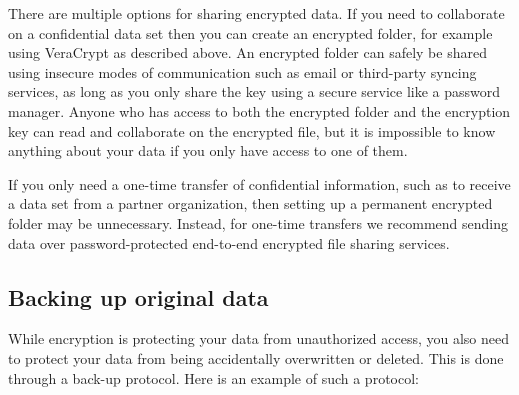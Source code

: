 There are multiple options for sharing encrypted data.
If you need to collaborate on a confidential data set
then you can create an encrypted folder,
for example using VeraCrypt as described above.
An encrypted folder can safely be shared using insecure modes of communication
such as email or third-party syncing services,
as long as you only share the key
using a secure service like a password manager.
Anyone who has access to both the encrypted folder and the encryption key
can read and collaborate on the encrypted file,
but it is impossible to know anything about your data
if you only have access to one of them.

If you only need a one-time transfer of confidential information,
such as to receive a data set from a partner organization,
then setting up a permanent encrypted folder may be unnecessary.
Instead, for one-time transfers we recommend sending data over password-protected
end-to-end encrypted file sharing services.

\subsection{Backing up original data}

While encryption is protecting your data from unauthorized access,
you also need to protect your data
from being accidentally overwritten or deleted.
This is done through a back-up protocol.
Here is an example of such a protocol:

